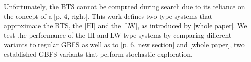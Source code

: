 Unfortunately, the BTS cannot be computed during search due to its reliance on the concept of a  [p. 4, right]. This work defines two type systems that approximate the BTS, the [HI] and the [LW], as introduced by [whole paper]. We test the performance of the HI and LW type systems by comparing different variants to regular GBFS as well as to  [p. 6, new section] and  [whole paper], two established GBFS variants that perform stochastic exploration.
